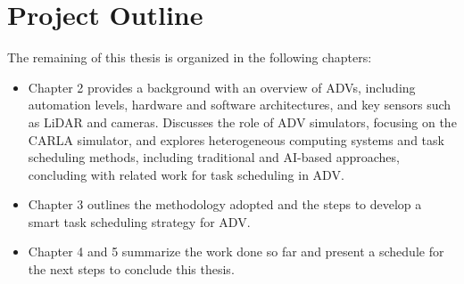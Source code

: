 



\section{Project Outline} \label{intro:organizacao}

The remaining of this thesis is organized in the following chapters:

\begin{itemize}
    \item Chapter 2 provides a background with an overview of ADVs, including automation levels, hardware and software architectures, and key sensors such as LiDAR and cameras. Discusses the role of ADV simulators, focusing on the CARLA simulator, and explores heterogeneous computing systems and task scheduling methods, including traditional and AI-based approaches, concluding with related work for task scheduling in ADV.
    \item Chapter 3 outlines the methodology adopted and the steps to develop a smart task scheduling strategy for ADV.
    \item Chapter 4 and 5 summarize the work done so far and present a schedule for the next steps to conclude this thesis.
\end{itemize}



